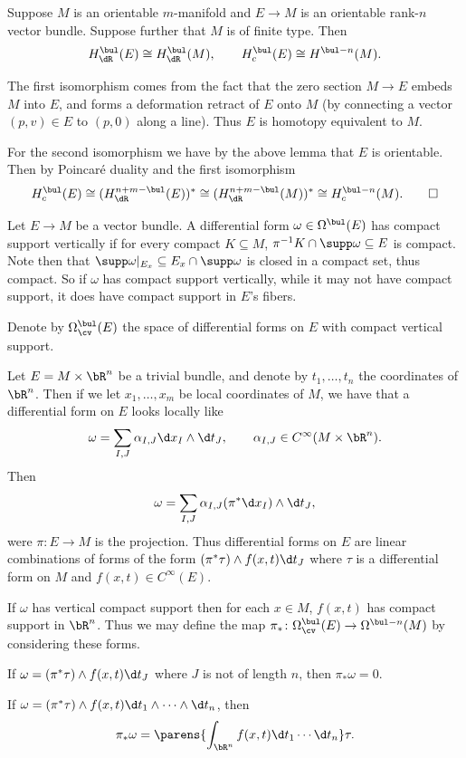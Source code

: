 \bcoro

    Suppose $M$ is an orientable $m$-manifold and $E\to M$ is an orientable rank-$n$ vector bundle.
    Suppose further that $M$ is of finite type.
    Then
    $$ H^\bul_\dR(E) \cong H^\bul_\dR(M),\qquad H^\bul_c(E) \cong H^{\bul-n}(M) . $$

\ecoro

\bproof

    The first isomorphism comes from the fact that the zero section $M\to E$ embeds $M$ into $E$, and forms a deformation
    retract of $E$ onto $M$ (by connecting a vector $(p,v)\in E$ to $(p,0)$ along a line).
    Thus $E$ is homotopy equivalent to $M$.

    For the second isomorphism we have by the above lemma that $E$ is orientable.
    Then by Poincar\'e duality and the first isomorphism
    $$ H^\bul_c(E) \cong (H^{n+m-\bul}_\dR(E))^* \cong (H^{n+m-\bul}_\dR(M))^* \cong H^{\bul-n}_c(M) . \qed $$

\eproof

\bdefn

    Let $E\to M$ be a vector bundle.
    A differential form $\omega\in\Omega^\bul(E)$ has {\emphcolor compact support vertically} if for every compact $K\subseteq M$,
    $\pi^{-1}K\cap\supp\omega\subseteq E$ is compact.
    Note then that $\supp\omega|_{E_x}\subseteq E_x\cap\supp\omega$ is closed in a compact set, thus compact.
    So if $\omega$ has compact support vertically, while it may not have compact support, it does have compact support in $E$'s fibers.

    Denote by $\Omega_\cv^\bul(E)$ the space of differential forms on $E$ with compact vertical support.

\edefn

Let $E=M\times\bR^n$ be a trivial bundle, and denote by $t_1,\dots,t_n$ the coordinates of $\bR^n$.
Then if we let $x_1,\dots,x_m$ be local coordinates of $M$, we have that a differential form on $E$ looks locally like
$$ \omega = \sum_{I,J}\alpha_{I,J}\d x_I\wedge\d t_J,\qquad \alpha_{I,J} \in C^\infty(M\times\bR^n) . $$
Then
$$ \omega = \sum_{I,J}\alpha_{I,J}(\pi^*\d x_I)\wedge\d t_J , $$
were $\pi\colon E\to M$ is the projection.
Thus differential forms on $E$ are linear combinations of forms of the form $(\pi^*\tau)\wedge f(x,t)\d t_J$ where $\tau$ is a differential
form on $M$ and $f(x,t)\in C^\infty(E)$.

If $\omega$ has vertical compact support then for each $x\in M$, $f(x,t)$ has compact support in $\bR^n$.
Thus we may define the map $\pi_*\colon\Omega^\bul_\cv(E)\to\Omega^{\bul-n}(M)$ by considering these forms.
\benum
    \item If $\omega=(\pi^*\tau)\wedge f(x,t)\d t_J$ where $J$ is not of length $n$, then $\pi_*\omega=0$.
    \item If $\omega=(\pi^*\tau)\wedge f(x,t)\d t_1\wedge\cdots\wedge\d t_n$, then
    $$ \pi_*\omega = \parens{\int_{\bR^n}f(x,t)\d t_1\cdots\d t_n}\tau . $$
\eenum

